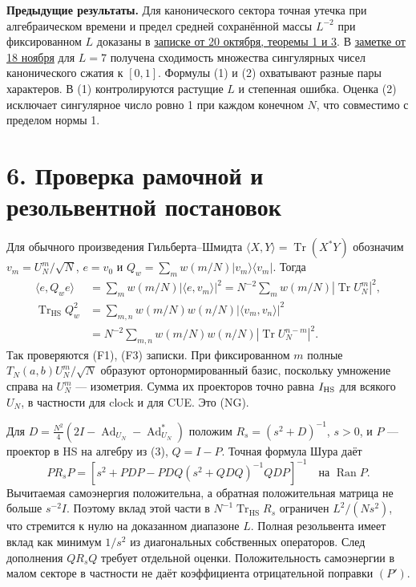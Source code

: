 \documentclass[11pt,a4paper]{article}
\newcommand{\Tr}{\operatorname{Tr}}
\newcommand{\Ad}{\operatorname{Ad}}
\newcommand{\sect}[1]{\section*{\sffamily\color{ink}#1}}
\newcommand{\subt}[1]{\par\medskip\noindent\textbf{#1.}\quad}
\begin{document}
\subt{Предыдущие результаты}
Для канонического сектора точная утечка при алгебраическом времени и предел средней сохранённой массы \(L^{-2}\) при фиксированном \(L\) доказаны в
\href{https://github.com/ChurilovMaksim/BGS/blob/e2757e4cc5ef996e08190f88c93c710377c10c22/mathematics/spectral_research/proofs/research_round2_2026_10_20/arithmetic_oldspace_escape.md}{записке от 20 октября, теоремы 1 и 3}.
В
\href{https://github.com/ChurilovMaksim/BGS/blob/e2757e4cc5ef996e08190f88c93c710377c10c22/mathematics/fixed-map/seven_oldspace_singular_spectrum.md}{заметке от 18 ноября}
для \(L=7\) получена сходимость множества сингулярных чисел канонического сжатия к \([0,1]\). Формулы (1) и (2) охватывают разные пары характеров. В (1) контролируются растущие \(L\) и степенная ошибка. Оценка (2) исключает сингулярное число ровно 1 при каждом конечном \(N\), что совместимо с пределом нормы 1.

\newpage
\sect{6. Проверка рамочной и резольвентной постановок}
Для обычного произведения Гильберта--Шмидта \(\langle X,Y\rangle=\Tr(X^*Y)\) обозначим \(v_m=U_N^m/\sqrt N\), \(e=v_0\) и \(Q_w=\sum_m w(m/N)|v_m\rangle\langle v_m|\). Тогда
\begin{align*}
 \langle e,Q_w e\rangle
   &=\sum_m w(m/N)|\langle e,v_m\rangle|^2
     =N^{-2}\sum_m w(m/N)|\Tr U_N^m|^2,\\
 \Tr_{\mathrm{HS}}Q_w^2
   &=\sum_{m,n}w(m/N)w(n/N)|\langle v_m,v_n\rangle|^2\\
   &=N^{-2}\sum_{m,n}w(m/N)w(n/N)|\Tr U_N^{n-m}|^2 .
\end{align*}
Так проверяются (F1), (F3) записки. При фиксированном \(m\) полные \(T_N(a,b)U_N^m/\sqrt N\) образуют ортонормированный базис, поскольку умножение справа на \(U_N^m\) — изометрия. Сумма их проекторов точно равна \(I_{\rm HS}\) для всякого \(U_N\), в частности для clock и для CUE. Это (NG).

Для \(D=\tfrac{N^2}{4}(2I-\Ad_{U_N}-\Ad_{U_N}^*)\) положим \(R_s=(s^2+D)^{-1}\), \(s>0\), и \(P\) — проектор в HS на алгебру из (3), \(Q=I-P\). Точная формула Шура даёт
\[
   P R_s P =
   [s^2+PDP-PDQ(s^2+QDQ)^{-1}QDP]^{-1}
   \quad\text{на }\operatorname{Ran}P .
\]
Вычитаемая самоэнергия положительна, а обратная положительная матрица не больше \(s^{-2}I\). Поэтому вклад этой части в \(N^{-1}\Tr_{\mathrm{HS}}R_s\) ограничен \(L^2/(Ns^2)\), что стремится к нулю на доказанном диапазоне \(L\). Полная резольвента имеет вклад как минимум \(1/s^2\) из диагональных собственных операторов. След дополнения \(Q R_s Q\) требует отдельной оценки. Положительность самоэнергии в малом секторе в частности не даёт коэффициента отрицательной поправки \((P')\).
\end{document}
